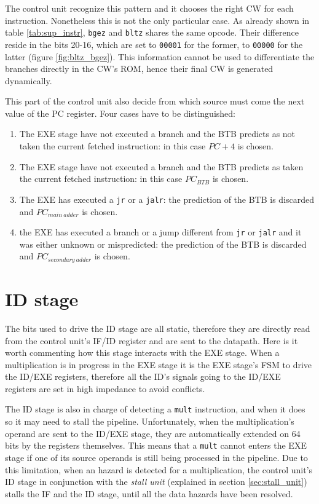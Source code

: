 The control unit recognize this pattern and it chooses the right CW for each instruction. Nonetheless this is not the only particular case. As already shown in table \ref{tab:sup_instr},
\verb|bgez| and \verb|bltz| shares the same opcode. Their difference reside in the bits 20-16, which are set to \verb|00001| for the former, to \verb|00000| for the latter (figure \ref{fig:bltz_bgez}).
This information cannot be used to differentiate the branches directly in the CW's ROM, hence their final CW is generated dynamically.

This part of the control unit also decide from which source must come the next value of the PC register. Four cases have to be distinguished:

\begin{enumerate}
    \item The EXE stage have not executed a branch and the BTB predicts as not taken the current fetched instruction: in this case $PC + 4$ is chosen.
    \item The EXE stage have not executed a branch and the BTB predicts as taken the current fetched instruction: in this case $PC_{BTB}$ is chosen.
    \item The EXE has executed a \verb|jr| or a \verb|jalr|: the prediction of the BTB is discarded and $PC_{main\ adder}$ is chosen.
    \item the EXE has executed a branch or a jump different from \verb|jr| or \verb|jalr| and it was either unknown or mispredicted: the prediction of the BTB is discarded and $PC_{secondary\ adder}$ is chosen.
\end{enumerate}

\section{ID stage}

The bits used to drive the ID stage are all static, therefore they are directly read from the control unit's IF/ID register and are sent to the datapath. Here is it worth commenting
how this stage interacts with the EXE stage. When a multiplication is in progress in the EXE stage it is the EXE stage's FSM to drive the ID/EXE registers, therefore all the ID's signals
going to the ID/EXE registers are set in high impedance to avoid conflicts.

The ID stage is also in charge of detecting a \verb|mult| instruction, and when it does so it may need to stall the pipeline. Unfortunately, when the multiplication's operand are sent to the
ID/EXE stage, they are automatically extended on 64 bits by the registers themselves. This means that a \verb|mult| cannot enters the EXE stage if one of its source operands is still being processed
in the pipeline. Due to this limitation, when an hazard is detected for a multiplication, the control unit's ID stage in conjunction with the {\it stall unit} (explained in section \ref{sec:stall_unit})
stalls the IF and the ID stage, until all the data hazards have been resolved.


